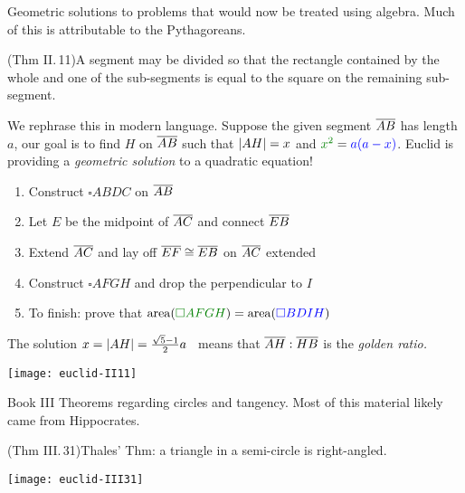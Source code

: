 \begin{description}
	\item[Book II]\lstsp Geometric solutions to problems that would now be treated using algebra. Much of this is attributable to the Pythagoreans.\par
	(Thm II.\,11)\lstsp A segment may be divided so that the rectangle contained by the whole and one of the sub-segments is equal to the square on the remaining sub-segment.\par
	We rephrase this in modern language. Suppose the given segment $\overline{AB}$ has length $a$, our goal is to find $H$ on $\overline{AB}$ such that $\left| AH\right|=x$ and $\textcolor{Green}{x^2}=\textcolor{blue}{a(a-x)}$. Euclid is providing a \emph{geometric solution} to a quadratic equation!\par
	\begin{minipage}[t]{0.69\linewidth}\vspace{-8pt}
		\begin{enumerate}\itemsep2pt
		  \item Construct $\square ABDC$ on $\overline{AB}$
			\item Let $E$ be the midpoint of $\overline{AC}$ and connect $\overline{EB}$
			\item Extend $\overline{AC}$ and lay off $\overline{EF}\cong\overline{EB}$ on $\overline{AC}$ extended
			\item Construct $\square AFGH$ and drop the perpendicular to $I$
			\item To finish: prove that $\operatorname{area}(\textcolor{Green}{\square AFGH}) =\operatorname{area}(\textcolor{blue}{\square BDIH})$
		\end{enumerate}
		The solution $x=\left| AH\right|=\frac{\sqrt 5-1}2a$ \, means that $\overline{AH}:\overline{HB}$ is the \emph{golden ratio.}
	\end{minipage}
	\hfill
	\begin{minipage}[t]{0.3\linewidth}\vspace{-10pt}
		\flushright
		\texttt{[image: euclid-II11]}
	\end{minipage}
	\medbreak



	\begin{minipage}[t]{0.74\linewidth}\vspace{0pt}
		\item[Book III]\lstsp Theorems regarding circles and tangency. Most of this material likely came from Hippocrates.\label{pg:thalesthm}\par
		  (Thm III.\,31)\lstsp Thales' Thm: a triangle in a semi-circle is right-angled.  
	\end{minipage}
	\hfill
	\begin{minipage}[t]{0.25\linewidth}\vspace{0pt}
		\flushright
		\texttt{[image: euclid-III31]}
	\end{minipage}



\end{description}
